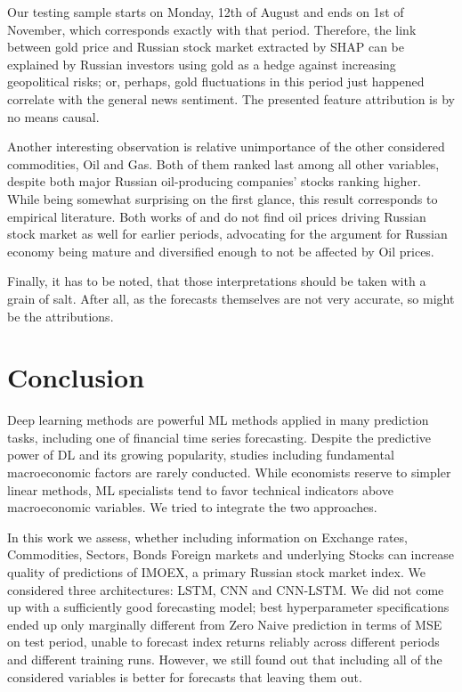 \documentclass[review, authoryear]{elsarticle}
\begin{document}
Our testing sample starts on Monday, 12th of August and ends on 1st of November, which corresponds exactly with that period. Therefore, the link between gold price and Russian stock market extracted by SHAP can be explained by Russian investors using gold as a hedge against increasing geopolitical risks; or, perhaps, gold fluctuations in this period just happened correlate with the general news sentiment. The presented feature attribution is by no means causal.

Another interesting observation is relative unimportance of the other considered commodities, Oil and Gas. Both of them ranked last among all other variables, despite both major Russian oil-producing companies' stocks ranking higher. While being somewhat surprising on the first glance, this result corresponds to empirical literature. Both works of \cite{korhonen_what_2016} and \cite{robert_d_gay_effect_2008} do not find oil prices driving Russian stock market as well for earlier periods, advocating for the argument for Russian economy being mature and diversified enough to not be affected by Oil prices.

Finally, it has to be noted, that those interpretations should be taken with a grain of salt. After all, as the forecasts themselves are not very accurate, so might be the attributions.

\section{Conclusion}

Deep learning methods are powerful ML methods applied in many prediction tasks, including one of financial time series forecasting.
Despite the predictive power of DL and its growing popularity, studies including fundamental macroeconomic factors are rarely conducted. While economists reserve to simpler linear methods, ML specialists tend to favor technical indicators above macroeconomic variables. We tried to integrate the two approaches. 

In this work we assess, whether including information on Exchange rates, Commodities, Sectors, Bonds Foreign markets and underlying Stocks can increase quality of predictions of IMOEX, a primary Russian stock market index. 
We considered three architectures: LSTM, CNN and CNN-LSTM. We did not come up with a sufficiently good forecasting model; best hyperparameter specifications ended up only marginally different from Zero Naive prediction in terms of MSE on test period, unable to forecast index returns reliably across different periods and different training runs. However, we still found out that including all of the considered variables is better for forecasts that leaving them out.
\end{document}
